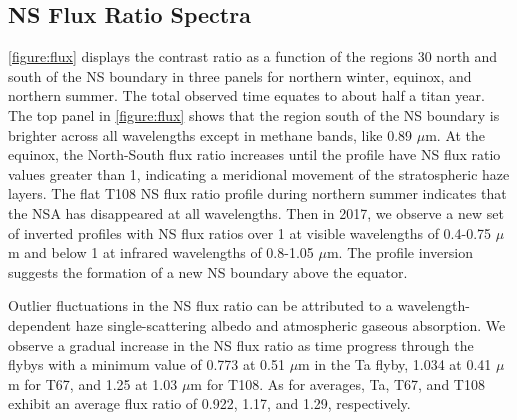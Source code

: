 \documentclass[apj,tighten]{emulateapj}
\begin{document}
\subsection{NS Flux Ratio Spectra}
\autoref{figure:flux} displays the contrast ratio as a function of the regions 30\degree{} north and south of the NS boundary in three panels for northern winter, equinox, and northern summer.
The total observed time equates to about half a titan year.
The top panel in \autoref{figure:flux} shows that the region south of the NS boundary is brighter across all wavelengths except in methane bands, like 0.89 $\mu$m.
At the equinox, the North-South flux ratio increases until the profile have NS flux ratio values greater than 1, indicating a meridional movement of the stratospheric haze layers.
The flat T108 NS flux ratio profile during northern summer indicates that the NSA has disappeared at all wavelengths.
Then in 2017, we observe a new set of inverted profiles with NS flux ratios over 1 at visible wavelengths of 0.4-0.75 $\mu$m and below 1 at infrared wavelengths of 0.8-1.05 $\mu$m.
The profile inversion suggests the formation of a new NS boundary above the equator. 

Outlier fluctuations in the NS flux ratio can be attributed to a wavelength-dependent haze single-scattering albedo and atmospheric gaseous absorption.
We observe a gradual increase in the NS flux ratio as time progress through the flybys with a minimum value of 0.773 at 0.51 $\mu$m in the Ta flyby, 1.034 at 0.41 $\mu$m for T67, and 1.25 at 1.03 $\mu$m for T108.
As for averages, Ta, T67, and T108 exhibit an average flux ratio of 0.922, 1.17, and 1.29, respectively.
\end{document}
